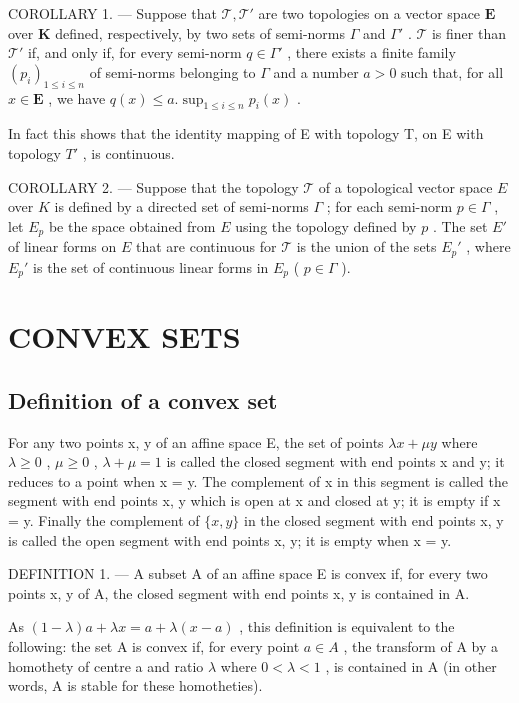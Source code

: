 COROLLARY 1. --- Suppose that \(\mathcal{T}, \mathcal{T}'\) are two topologies on a vector space \(\mathbf{E}\) over \(\mathbf{K}\) defined, respectively, by two sets of semi-norms \(\Gamma\) and \(\Gamma'\) . \(\mathcal{T}\) is finer than \(\mathcal{T}'\) if, and only if, for every semi-norm \(q \in \Gamma'\) , there exists a finite family \((p_i)_{1 \leqslant i \leqslant n}\) of semi-norms belonging to \(\Gamma\) and a number \(a > 0\) such that, for all \(x \in \mathbf{E}\) , we have \(q(x) \leqslant a . \sup_{1 \leqslant i \leqslant n} p_i(x)\) .

In fact this shows that the identity mapping of E with topology T, on E with topology \(T'\) , is continuous.

COROLLARY 2. --- Suppose that the topology \(\mathcal{T}\) of a topological vector space \(E\) over \(K\) is defined by a directed set of semi-norms \(\Gamma\) ; for each semi-norm \(p \in \Gamma\) , let \(E_p\) be the space obtained from \(E\) using the topology defined by \(p\) . The set \(E'\) of linear forms on \(E\) that are continuous for \(\mathcal{T}\) is the union of the sets \(E_p'\) , where \(E_p'\) is the set of continuous linear forms in \(E_p\) ( \(p \in \Gamma\) ).

\section{CONVEX SETS}

\subsection{Definition of a convex set}

For any two points x, y of an affine space E, the set of points \(\lambda x + \mu y\) where \(\lambda \geqslant 0\) , \(\mu \geqslant 0\) , \(\lambda + \mu = 1\) is called the closed segment with end points x and y; it reduces to a point when x = y. The complement of x in this segment is called the segment with end points x, y which is open at x and closed at y; it is empty if x = y. Finally the complement of \(\{x, y\}\) in the closed segment with end points x, y is called the open segment with end points x, y; it is empty when x = y.

DEFINITION 1. --- A subset A of an affine space E is convex if, for every two points x, y of A, the closed segment with end points x, y is contained in A.

As \((1 - \lambda)a + \lambda x = a + \lambda(x - a)\) , this definition is equivalent to the following: the set A is convex if, for every point \(a \in A\) , the transform of A by a homothety of centre a and ratio \(\lambda\) where \(0 < \lambda < 1\) , is contained in A (in other words, A is stable for these homotheties).

